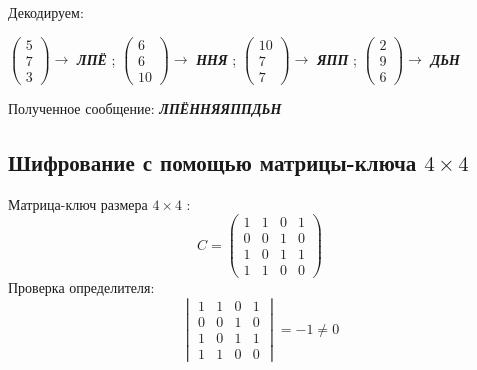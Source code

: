 \documentclass[a5paper, 10pt]{article}
\theoremstyle{definition}
\theoremstyle{plain}
\theoremstyle{remark}
\begin{document}
Декодируем:
\begin{center}
 $ \begin{pmatrix}
5 \\
7\\
3
\end{pmatrix} \to$ \textbf{\textit{ЛПЁ}} ;
 $ \begin{pmatrix}
6 \\
6\\
10
\end{pmatrix} \to$ \textbf{\textit{ННЯ}} ;
 $ \begin{pmatrix}
10 \\
7\\
7
\end{pmatrix} \to$ \textbf{\textit{ЯПП}} ;
 $ \begin{pmatrix}
 2 \\
9\\
6
\end{pmatrix} \to$ \textbf{\textit{ДЬН}}  \\

\end{center}
Полученное сообщение:  \textbf{\textit{ЛПЁННЯЯППДЬН}}

\subsection{Шифрование с помощью матрицы-ключа $4 \times 4$}
Матрица-ключ размера  $4 \times 4$ :
\begin{equation}
C =
\begin{pmatrix}
1 & 1 & 0 & 1\\
0 & 0 & 1 & 0 \\
1 & 0 & 1 & 1 \\
1 & 1 & 0 & 0
\end{pmatrix}
\end{equation}
Проверка определителя:
\begin{equation}
\begin{vmatrix}
1 & 1 & 0 & 1\\
0 & 0 & 1 & 0 \\
1 & 0 & 1 & 1 \\
1 & 1 & 0 & 0
\end{vmatrix}
= -1 \neq 0
\end{equation}
\end{document}
